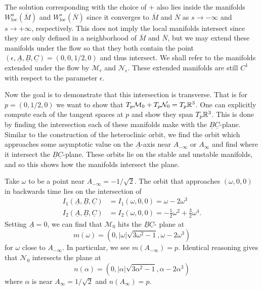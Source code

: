 The solution corresponding with the choice of \(+\) also lies inside the manifolds \(W^u_{\mathrm{loc}}(\overline M)\) and \(W^s_{\mathrm{loc}}(\overline N)\) since it converges to \(\overline M\) and \(\overline N\) as \(s\to - \infty \) and \(s\to +\infty\), respectively. This does not imply the local manifolds intersect since they are only defined in a neighborhood of \(\overline M\) and \(\overline N\), but we may extend these manifolds under the flow so that they both contain the point \((\epsilon , \underline A, \underline B, \underline C) = (0, 0, 1/2, 0)\) and thus intersect. We shall refer to the manifolds extended under the flow by \(\mathcal M_\epsilon\) and \(\mathcal N_\epsilon\). These extended manifolds are still \(C^1\) with respect to the parameter \(\epsilon\).

Now the goal is to demonstrate that this intersection is transverse. That is for \(p = (0,1/2,0)\) we want to show that \(T_p\mathcal M_0 + T_p \mathcal N_0 = T_p \mathbb{R}^3\). One can explicitly compute each of the tangent spaces at \(p\) and show they span \(T_p\mathbb{R}^3\). This is done by finding the intersection each of these manifolds make with the \(\underline B\underline C\)-plane. Similar to the construction of the heteroclinic orbit, we find the orbit which approaches some asymptotic value on the \(\underline A\)-axis near \(A_{-\infty}\) or \(A_{\infty}\) and find where it intersect the \(\underline B\underline C\)-plane. These orbits lie on the stable and unstable manifolds, and so this shows how the manifolds intersect the plane.

Take \(\omega\) to be a point near \(A_{-\infty} = - 1/\sqrt 2\). The orbit that approaches \((\omega, 0, 0)\) in backwards time lies on the intersection of 
\begin{equation}
	\begin{aligned}
		I_1(\underline A, \underline B, \underline C) &= I_1(\omega, 0, 0) = \omega - 2\omega^3 \\
		I_2(\underline A, \underline B, \underline C) &= I_2(\omega, 0, 0) = - \frac 1 2 \omega^2 + \frac 3 2 \omega^4.
	\end{aligned}
\end{equation}
Setting \(\underline A = 0\), we can find that \(\mathcal M_0\) hits the \(\underline B \underline C\)- plane at 
\begin{equation}
	m(\omega) = (0, |\omega| \sqrt{3\omega^2 -1 }, \omega - 2\omega^3)
\end{equation}
for \(\omega\) close to \(A_{-\infty}\). In particular, we see \(m(A_{-\infty}) = p\). Identical reasoning gives that \(\mathcal N_0\) intersects the plane at 
\begin{equation}\label{intersection-with-plane}
	n(\alpha) = (0, |\alpha| \sqrt{3\alpha^2 -1 }, \alpha - 2\alpha^3)
\end{equation}
where \(\alpha\) is near \(A_\infty = 1 / \sqrt 2\) and \(n (A_{\infty} ) = p\).

